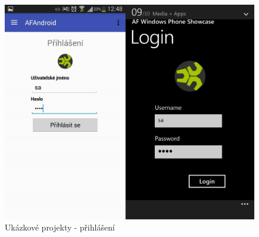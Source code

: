 \begin{figure}
\begin{center}
\includegraphics[width=\linewidth, height=\textheight, keepaspectratio]{figures/screenshots/Login}
\caption{Ukázkové projekty - přihlášení}  
\label{img:login}
\end{center}
\end{figure}

